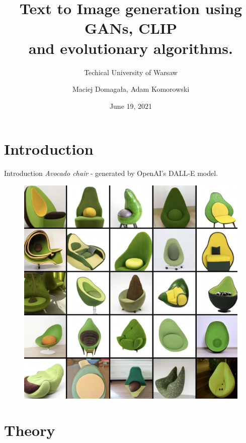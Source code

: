 \documentclass[t]{beamer}
\title{Text to Image generation using GANs,  CLIP  \\ and evolutionary algorithms.}
\subtitle{Techical University of Warsaw}
\author{Maciej Domagała, Adam Komorowski}
\date{June 19, 2021}
\begin{document}
\begin{frame}
\titlepage
\end{frame}

\section{Introduction}

\begin{frame}{Introduction}
\textit{Avocado chair} - generated by OpenAI's DALL-E model.
\begin{figure}[ht!]
    \centering
    \includegraphics[scale=0.2]{dalle_avocado.png}
\end{figure} 
\end{frame}

\section{Theory}
\end{document}
